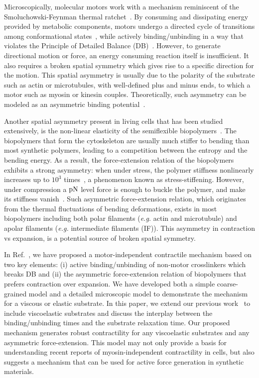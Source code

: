 \documentclass[twocolumn,prl,english]{revtex4-1}
\begin{document}
Microscopically, molecular motors work with a mechanism reminiscent of the Smoluchowski-Feynman thermal ratchet~\cite{Feynman1963,Magnasco1993,Prost1994,Julicher1997}. By consuming and dissipating energy provided by metabolic components, motors undergo a directed cycle of transitions among conformational states~\cite{Spudich2001387}, while actively binding/unbinding in a way that violates the Principle of Detailed Balance (DB)~\cite{Boltzmann1872,Julicher1997, Battle2016604,Nardini2017,Markovich2020}. However, to generate directional motion or force, an energy consuming reaction itself is insufficient. It also requires a broken spatial symmetry which gives rise to a specific direction for the motion. This spatial asymmetry is usually due to the polarity of the substrate such as actin or microtubules, with well-defined plus and minus ends, to which a motor such as myosin or kinesin couples. Theoretically, such asymmetry  can be modeled as an asymmetric binding potential~\cite{Magnasco1993,Prost1994,Julicher1997}.

Another spatial asymmetry present in living cells that has been studied extensively, is the non-linear elasticity of the semiflexible biopolymers~\cite{Storm2005191,Gardel20061762,Mizuno2007}. The biopolymers that form the cytoskeleton are usually much stiffer to bending than most synthetic polymers, leading to a competition between the entropy and the bending energy. As a result, the force-extension relation of the biopolymers exhibits a strong asymmetry: when under stress, the polymer stiffness nonlinearly increases up to $10^3$ times~\cite{Bustamante19941599,Marko1994,Gardel20041301,Mizuno2007,Gardel20061762,Koenderink2009}, a phenomenon known as stress-stiffening.  However, under compression a $\rm pN$ level force is enough to buckle the polymer, and make its stiffness vanish~\cite{Broedersz2014}.  Such asymmetric force-extension relation, which originates from the thermal fluctuations of bending deformations, exists in most biopolymers including both polar filaments ({\it e.g.} actin and microtubule) and apolar filaments ({\it e.g.} intermediate filaments (IF)). This asymmetry in contraction vs expansion, is a potential source of broken spatial symmetry. 

In Ref.~{\cite{Chen2020}}, we have proposed a motor-independent contractile mechanism based on two key elements: (i) active binding/unbinding of non-motor crosslinkers which breaks DB and (ii) the asymmetric force-extension relation of biopolymers that prefers contraction over expansion. We have developed both a simple coarse-grained model and a detailed microscopic model to demonstrate the mechanism for a viscous or elastic substrate. In this paper, we extend our previous work~\cite{Chen2020} to include viscoelastic substrates and discuss the interplay between the binding/unbinding times and the substrate relaxation time.  Our proposed mechanism generates robust contractility for any viscoelastic substrates and any asymmetric force-extension. This model may not only provide a basis for understanding recent reports of myosin-independent contractility in cells, but also suggests a mechanism that can be used for active force generation in synthetic materials. 
\end{document}
